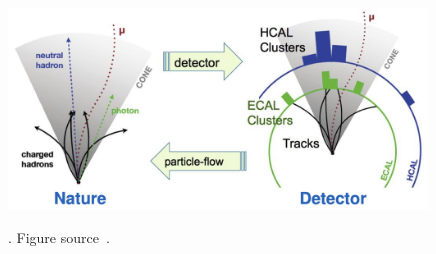 \begin{figure}[t!]
\centering
\includegraphics[width=0.99\textwidth]{figures/PF.png}
\caption[how PF translate detector info]{}. Figure source~\cite{SMtable}.                                                                        
\label{fig:PF_diagram}                                                                                                               
\end{figure}

